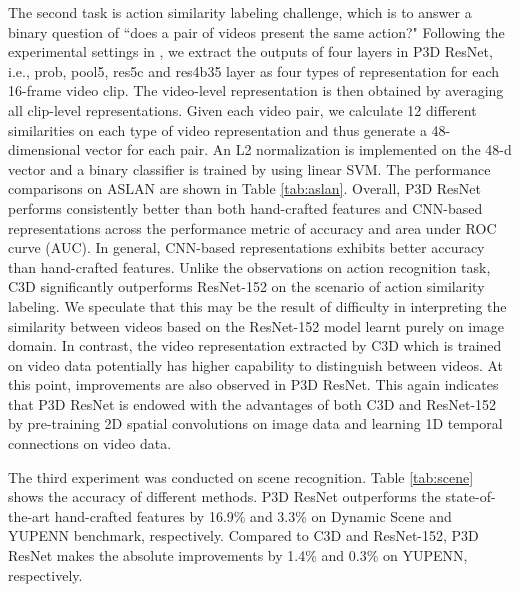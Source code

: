 \documentclass[10pt,twocolumn,letterpaper]{article}
\begin{document}
The second task is action similarity labeling challenge, which is to answer a binary question of ``does a pair of videos present the same action?" Following the experimental settings in \cite{KG:PAMI12,tran2015learning}, we extract the outputs of four layers in P3D ResNet, i.e., prob, pool5, res5c and res4b35 layer as four types of representation for each 16-frame video clip. The video-level representation is then obtained by averaging all clip-level representations. Given each video pair, we calculate 12 different similarities on each type of video representation and thus generate a 48-dimensional vector for each pair. An L2 normalization is implemented on the 48-d vector and a binary classifier is trained by using linear SVM. The performance comparisons on ASLAN are shown in Table \ref{tab:aslan}. Overall, P3D ResNet performs consistently better than both hand-crafted features and CNN-based representations across the performance metric of accuracy and area under ROC curve (AUC). In general, CNN-based representations exhibits better accuracy than hand-crafted features. Unlike the observations on action recognition task, C3D significantly outperforms ResNet-152 on the scenario of action similarity labeling. We speculate that this may be the result of difficulty in interpreting the similarity between videos based on the ResNet-152 model learnt purely on image domain. In contrast, the video representation extracted by C3D which is trained on video data potentially has higher capability to distinguish between videos. At this point, improvements are also observed in P3D ResNet. This again indicates that P3D ResNet is endowed with the advantages of both C3D and ResNet-152 by pre-training 2D spatial convolutions on image data and learning 1D temporal connections on video data.

The third experiment was conducted on scene recognition. Table \ref{tab:scene} shows the accuracy of different methods. P3D ResNet outperforms the state-of-the-art hand-crafted features \cite{feichtenhofer2014bags} by 16.9\% and 3.3\% on Dynamic Scene and YUPENN benchmark, respectively. Compared to C3D and ResNet-152, P3D ResNet makes the absolute improvements by 1.4\% and 0.3\% on YUPENN, respectively.

\end{document}
